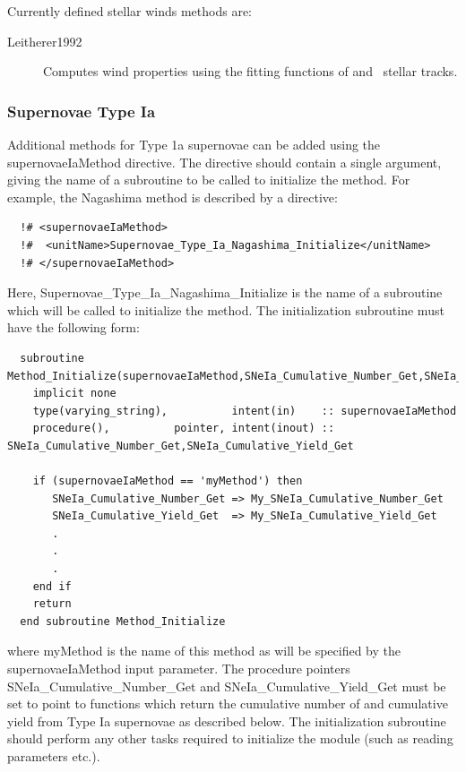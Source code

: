 Currently defined stellar winds methods are:
\begin{description}
 \item [{\normalfont \ttfamily Leitherer1992}] Computes wind properties using the fitting functions of \cite{leitherer_deposition_1992} and \glc\ stellar tracks.
\end{description}

\subsubsection{Supernovae Type Ia}

Additional methods for Type 1a supernovae can be added using the {\normalfont \ttfamily supernovaeIaMethod} directive. The directive should contain a single argument, giving the name of a subroutine to be called to initialize the method. For example, the {\normalfont \ttfamily Nagashima} method is described by a directive:
\begin{verbatim}
  !# <supernovaeIaMethod>
  !#  <unitName>Supernovae_Type_Ia_Nagashima_Initialize</unitName>
  !# </supernovaeIaMethod>
\end{verbatim}
Here, {\normalfont \ttfamily Supernovae\_Type\_Ia\_Nagashima\_Initialize} is the name of a subroutine which will be called to initialize the method. The initialization subroutine must have the following form:
\begin{verbatim}
  subroutine Method_Initialize(supernovaeIaMethod,SNeIa_Cumulative_Number_Get,SNeIa_Cumulative_Yield_Get)
    implicit none
    type(varying_string),          intent(in)    :: supernovaeIaMethod
    procedure(),          pointer, intent(inout) :: SNeIa_Cumulative_Number_Get,SNeIa_Cumulative_Yield_Get
    
    if (supernovaeIaMethod == 'myMethod') then
       SNeIa_Cumulative_Number_Get => My_SNeIa_Cumulative_Number_Get
       SNeIa_Cumulative_Yield_Get  => My_SNeIa_Cumulative_Yield_Get
       .
       .
       .
    end if
    return
  end subroutine Method_Initialize
\end{verbatim}
where {\normalfont \ttfamily myMethod} is the name of this method as will be specified by the {\normalfont \ttfamily supernovaeIaMethod} input parameter. The procedure pointers {\normalfont \ttfamily SNeIa\_Cumulative\_Number\_Get} and {\normalfont \ttfamily SNeIa\_Cumulative\_Yield\_Get} must be set to point to functions which return the cumulative number of and cumulative yield from Type Ia supernovae as described below. The initialization subroutine should perform any other tasks required to initialize the module (such as reading parameters etc.).

